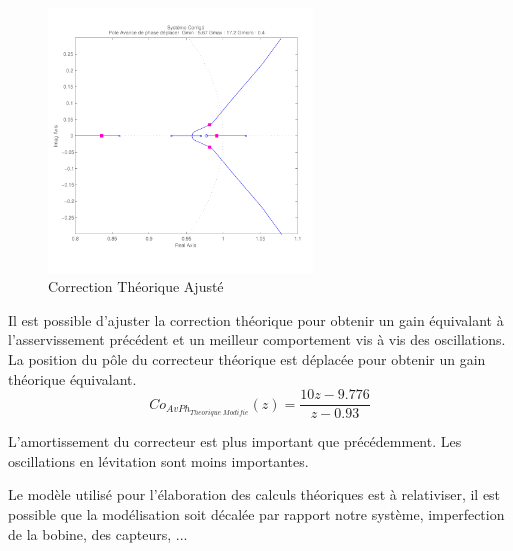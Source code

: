 \documentclass[11pt, french]{article} %
\begin{document}
\begin{figure}
	\vspace{-0.5cm}
	\includegraphics[width = 7cm,trim=0 1.4cm 0 0.7cm ,clip=true]
					{SolutionNumerique/SystemeCorrigeThoriqueAdapte.pdf}
	\caption{Correction Théorique Ajusté}
\end{figure}
Il est possible d'ajuster la correction théorique pour obtenir un gain équivalant à l'asservissement précédent et un meilleur comportement vis à vis des oscillations. La position du pôle du correcteur théorique est déplacée pour obtenir un gain théorique équivalant. 
\[  Co_{AvPh_{Theorique \; Modifie}}(z) = \dfrac {10z - 9.776} {z - 0.93} \]

L'amortissement du correcteur est plus important que précédemment. Les oscillations en lévitation sont moins importantes.

Le modèle utilisé pour l'élaboration des calculs théoriques est à relativiser, il est possible que la modélisation soit décalée par rapport notre système, imperfection de la bobine, des capteurs, ...

%
%
%
%
%
%
\end{document}
